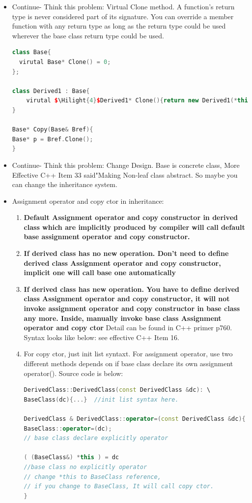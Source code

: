 \documentclass[a4paper,12pt,twoside]{book}
\newcommand{\Hilight}[1]{\makebox[0pt][l]{\color{yellow}\rule[-3pt]{#1em}{11pt}}}
\begin{document}
\begin{itemize}
\item Continue- Think this problem: Virtual Clone method.
A function's return type is never considered part of its signature. You can override a member
function with any return type as long as the return type could be used wherever the base class
return type could be used.
\begin{lstlisting}[frame=single, language=c++, mathescape=true]
class Base{
  virutal Base* Clone() = 0;
};

class Derived1 : Base{
    virutal $\Hilight{4}$Derived1* Clone(){return new Derived1(*this);}
}

Base* Copy(Base& Bref){
Base* p = Bref.Clone();
}
\end{lstlisting}


\item Continue- Think this problem: Change Design. Base is concrete class,  More Effective C++ Item 33 said"Making Non-leaf class abstract. So maybe you can change the inheritance system.

\item Assignment operator and copy ctor in inheritance:
\begin{enumerate}
\item \textbf{Default Assignment  operator and  copy constructor in derived class which are implicitly produced by compiler will call default base assignment  operator and  copy constructor.}

\item \textbf{If derived class has no new operation. Don't need to define derived class Assignment  operator and  copy constructor, implicit one will call base one automatically}

\item \textbf{If derived class has new operation. You have to define derived class Assignment  operator and  copy constructor, it will not invoke assignment  operator and  copy constructor in base class any more.  Inside, manually invoke base class Assignment operator and copy ctor } Detail can be found in C++ primer p760. Syntax looks like below: see effective C++ Item 16.

\item For copy ctor, just init list syntaxt. For assignment operator, use two different methods depends on if base class declare its own assignment operator(). Source code is below:

\begin{lstlisting}[frame=single, language=c++]
DerivedClass::DerivedClass(const DerivedClass &dc): \
BaseClass(dc){...}  //init list syntax here.

DerivedClass & DerivedClass::operator=(const DerivedClass &dc){
BaseClass::operator=(dc);
// base class declare explicitly operator

( (BaseClass&) *this ) = dc
//base class no explicitly operator
// change *this to BaseClass reference,
// if you change to BaseClass, It will call copy ctor.
}
\end{lstlisting}

\end{enumerate}
\end{itemize}
\end{document}

